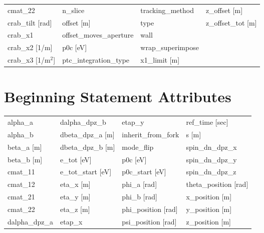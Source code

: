 \begin{tabular}{llll}
cmat_22                          & n_slice                          & tracking_method                  & z_offset [m]                     \\
crab_tilt [rad]                  & offset [m]                       & type                             & z_offset_tot [m]                 \\
crab_x1                          & offset_moves_aperture            & wall                             &                                  \\
crab_x2 [1/m]                    & p0c [eV]                         & wrap_superimpose                 &                                  \\
crab_x3 [1/m$^2$]                & ptc_integration_type             & x1_limit [m]                     &                                  \\
 \bottomrule
 \end{tabular}
 \vfill
 
 \section{Beginning Statement Attributes}
 \label{s:list.beginning}
 
 \begin{tabular}{llll} \toprule
alpha_a                          & dalpha_dpz_b                     & etap_y                           & ref_time [sec]                   \\
alpha_b                          & dbeta_dpz_a [m]                  & inherit_from_fork                & s [m]                            \\
beta_a [m]                       & dbeta_dpz_b [m]                  & mode_flip                        & spin_dn_dpz_x                    \\
beta_b [m]                       & e_tot [eV]                       & p0c [eV]                         & spin_dn_dpz_y                    \\
cmat_11                          & e_tot_start [eV]                 & p0c_start [eV]                   & spin_dn_dpz_z                    \\
cmat_12                          & eta_x [m]                        & phi_a [rad]                      & theta_position [rad]             \\
cmat_21                          & eta_y [m]                        & phi_b [rad]                      & x_position [m]                   \\
cmat_22                          & eta_z [m]                        & phi_position [rad]               & y_position [m]                   \\
dalpha_dpz_a                     & etap_x                           & psi_position [rad]               & z_position [m]                   \\
 \bottomrule
 \end{tabular}
 \vfill
 
